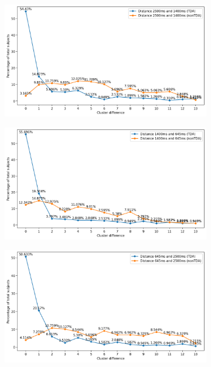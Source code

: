 \begin{figure}[H]%
	\centering
	\begin{subfigure}[t]{1\linewidth}
		\centering
		\hspace{8mm}
		\includegraphics[width=1\textwidth, trim={0cm, 0.0cm, 0.0cm, 0.0cm}]{figures/pairwise_2500_1400.png}\hfill
	\end{subfigure}
	\begin{subfigure}[t]{1\linewidth}
		\centering
		\hspace{8mm}
		\includegraphics[width=1\textwidth, trim={0cm, 0.0cm, 0.0cm, 0.0cm}]{figures/pairwise_1400_645.png}\hfill
	\end{subfigure}
	\begin{subfigure}[t]{1\linewidth}
		\centering
		\hspace{8mm}
		\includegraphics[width=1\textwidth, trim={0cm, 0.0cm, 0.0cm, 0.0cm}]{figures/pairwise_645_2500.png}\hfill

\end{subfigure}
\end{figure}

